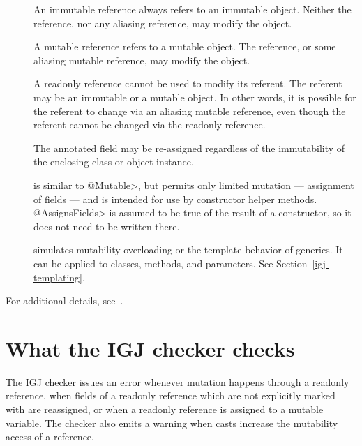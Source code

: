 \begin{description}

\item[]
  An immutable reference always refers to an immutable object.  Neither the
  reference, nor any aliasing reference, may modify the object.

\item[]
  A mutable reference refers to a mutable object.  The reference, or some
  aliasing mutable reference, may modify the object.

\item[]
  A readonly reference cannot be used to modify its referent.  The referent
  may be an immutable or a mutable object.  In other words, it is possible
  for the referent to change via an aliasing mutable reference, even though
  the referent cannot be changed via the readonly reference.

\item[]
  The annotated field may be re-assigned regardless of the
  immutability of the enclosing class or object instance.

\item[]
  is similar to \<@Mutable>, but permits only limited mutation ---
  assignment of fields --- and is intended for use by constructor helper
  methods.  \<@AssignsFields> is assumed to be true of the result of a
  constructor, so it does not need to be written there.

\item[]
  simulates mutability overloading or the template behavior of generics.
  It can be applied to classes, methods, and parameters.  See
  Section~\ref{igj-templating}.

\end{description}

For additional details, see~\cite{ZibinPAAKE2007}.


\section{What the IGJ checker checks\label{igj-checks}}

The IGJ checker issues an error whenever mutation happens through a
readonly reference, when fields of a readonly reference which are not
explicitly marked with  are
reassigned, or when a readonly reference is assigned to a mutable
variable.  The checker also emits a warning when casts increase the
mutability access of a reference.

